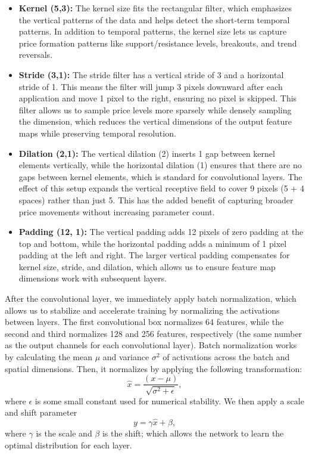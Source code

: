 \documentclass[12pt]{article}
\begin{document}
\begin{itemize}
	\item \textbf{Kernel (5,3):} The kernel size fits the rectangular filter, which emphasizes the vertical patterns of the data and helps detect the short-term temporal patterns. In addition to temporal patterns, the kernel size lets us capture price formation patterns like support/resistance levels, breakouts, and trend reversals.
	\item \textbf{Stride (3,1):} The stride filter has a vertical stride of 3 and a horizontal stride of 1. This means the filter will jump 3 pixels downward after each application and move 1 pixel to the right, ensuring no pixel is skipped. This filter allows us to sample price levels more sparsely while densely sampling the dimension, which reduces the vertical dimensions of the output feature maps while preserving temporal resolution.
	\item \textbf{Dilation (2,1):} The vertical dilation (2) inserts 1 gap between kernel elements vertically, while the horizontal dilation (1) ensures that there are no gaps between kernel elements, which is standard for convolutional layers. The effect of this setup expands the vertical receptive field to cover 9 pixels (5 + 4 spaces) rather than just 5. This has the added benefit of capturing broader price movements without increasing parameter count.
	\item \textbf{Padding (12, 1):} The vertical padding adds 12 pixels of zero padding at the top and bottom, while the horizontal padding adds a minimum of 1 pixel padding at the left and right. The larger vertical padding compensates for kernel size, stride, and dilation, which allows us to ensure feature map dimensions work with subsequent layers.
\end{itemize}
After the convolutional layer, we immediately apply batch normalization, which allows us to stabilize and accelerate training by normalizing the activations between layers. The first convolutional box normalizes 64 features, while the second and third normalizes 128 and 256 features, respectively (the same number as the output channels for each convolutional layer). Batch normalization works by calculating the mean $\mu$ and variance $\sigma^2$ of activations across the batch and spatial dimensions. Then, it normalizes by applying the following transformation:
\begin{equation}
	\hat{x}=\frac{(x-\mu)}{\sqrt{\sigma^2+\epsilon}},
\end{equation}
where $\epsilon$ is some small constant used for numerical stability. We then apply a scale and shift parameter
\begin{equation}
	y=\gamma\hat{x}+\beta,
\end{equation}
where $\gamma$ is the scale and $\beta$ is the shift; which allows the network to learn the optimal distribution for each layer.
\end{document}
